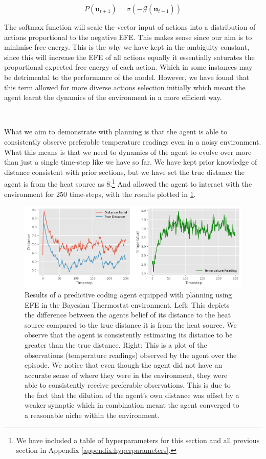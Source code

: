 \documentclass{article}
\begin{document}
\begin{equation}
	P(\textbf{u}_{t+1}) = \sigma( - \mathcal{G}(\textbf{u}_{t+1}) )
\end{equation}

The softmax function will scale the vector input of actions into a distribution of actions proportional to the negative EFE. This makes sense since our aim is to minimise free energy. This is the why we have kept in the ambiguity constant, since this will increase the EFE of all actions equally it essentially saturates the proportional expected free energy of each action. Which in some instances may be detrimental to the performance of the model. However, we have found that this term allowed for more diverse actions selection initially which meant the agent learnt the dynamics of the environment in a more efficient way.

\

What we aim to demonstrate with planning is that the agent is able to consistently observe preferable temperature readings even in a noisy environment. What this means is that we need to dynamics of the agent to evolve over more than just a single time-step like we have so far. We have kept prior knowledge of distance consistent with prior sections, but we have set the true distance the agent is from the heat source as 8.\footnote{We have included a table of hyperparameters for this section and all previous section in Appendix \ref{appendix:hyperparameters}.} And allowed the agent to interact with the environment for 250 time-steps, with the results plotted in \ref{fig:pc_example_planning}. 

\begin{figure}[htbp]
	\centering
	\includegraphics[scale=0.6]{images/pc_example_planning.png}
	\caption{Results of a predictive coding agent equipped with planning using EFE in the Bayesian Thermostat environment. Left: This depicts the difference between the agents belief of its distance to the heat source compared to the true distance it is from the heat source. We observe that the agent is consistently estimating its distance to be greater than the true distance. Right: This is a plot of the observations (temperature readings) observed by the agent over the episode. We notice that even though the agent did not have an accurate sense of where they were in the environment, they were able to consistently receive preferable observations. This is due to the fact that the dilution of the agent's own distance was offset by a weaker synaptic which in combination meant the agent converged to a reasonable niche within the environment.}
	\label{fig:pc_example_planning}
\end{figure}
\end{document}
